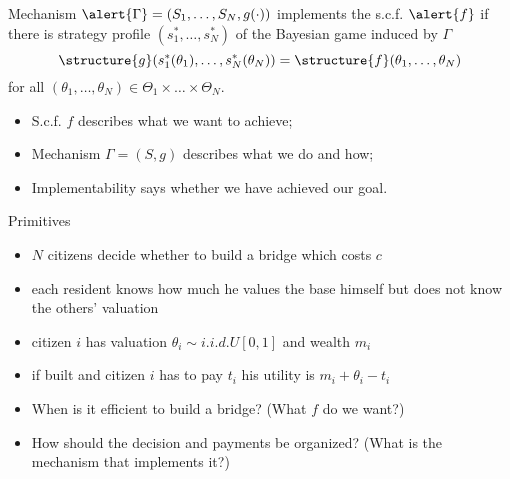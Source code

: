 \documentclass[english,handout]{beamer}		%
\def\lyxframeend{} %
\begin{document}
\begin{definition}[implementation]
	Mechanism $\alert{\Gamma}=(S_{1},\dots,S_{N},g(\cdot))$ \alert{implements} the s.c.f. $\alert{f}$ if there is  strategy profile $(s_{1}^{*},\dots,s_{N}^{*})$ of the Bayesian game induced by $\Gamma$  
	$$\structure{g}(s_{1}^{*}(\theta_{1}),\dots,s_{N}^{*}(\theta_{N})) = \structure{f} (\theta_{1},\dots,\theta_{N})$$ 
	for all $(\theta_{1},\dots,\theta_{N})\in\Theta_{1}\times\dots \times\Theta_{N}$.
\end{definition}
\lyxframeend


\begin{itemize}
	\item S.c.f. $f$ describes what we want to achieve;
	\item Mechanism $\Gamma = (S,g)$ describes what we do and how;
	\item Implementability says whether we have achieved our goal.
\end{itemize}
\lyxframeend


\begin{exampleblock}{Primitives}
	\begin{itemize}
		\item $N$ citizens decide whether to build a bridge which costs $c$
		\item each resident knows how much he values the base himself but does not know the others' valuation
		\item citizen $i$ has valuation $\theta_{i} \sim i.i.d.U[0,1]$ and wealth $m_{i}$
		\item if built and citizen $i$ has to pay $t_{i}$ his utility is $m_{i}+\theta_{i}-t_{i}$
	\end{itemize}
\end{exampleblock}
\begin{itemize}
	\item When is it efficient to build a bridge? (What $f$ do we want?)
	\item How should the decision and payments be organized? (What is the mechanism that implements it?)
\end{itemize}
\lyxframeend
\end{document}
